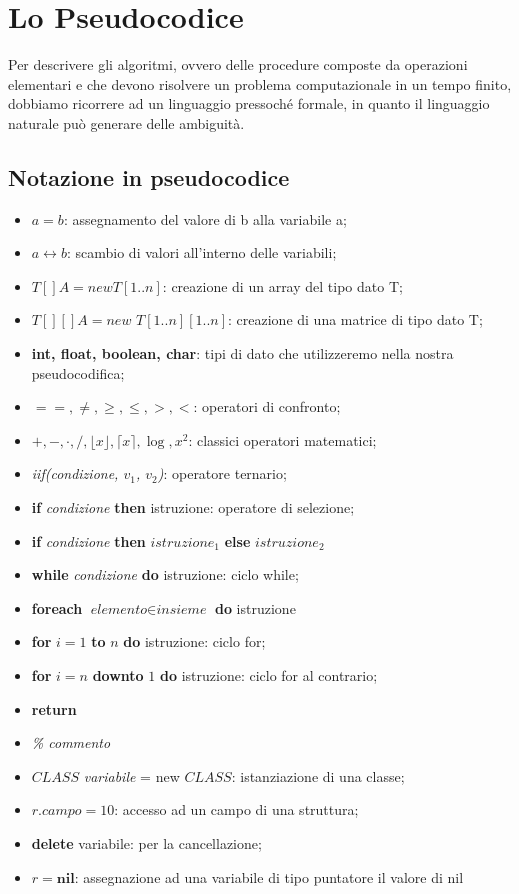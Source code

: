 \documentclass[../cheatSheetAlgoritmi.tex]{subfiles}
\begin{document}
\section{Lo Pseudocodice}
Per descrivere gli algoritmi, ovvero delle procedure composte da operazioni elementari e che devono risolvere un problema computazionale in un tempo finito, dobbiamo ricorrere ad un linguaggio pressoché formale, in quanto il linguaggio naturale può generare delle ambiguità.
\subsection{Notazione in pseudocodice}
\begin{itemize}
  	\item $a=b$: assegnamento del valore di b alla variabile a;
  	\item $a \leftrightarrow b$: scambio di valori all'interno delle variabili;
  	\item $T[] A = new T[1..n]$: creazione di un array del tipo dato T;
  	\item $T[][] A = new$ $T[1..n][1..n]$: creazione di una matrice di tipo dato T;
  	\item \textbf{int, float, boolean, char}: tipi di dato che utilizzeremo nella nostra pseudocodifica;
  	\item $==, \neq, \geq, \leq, >, <$: operatori di confronto;
  	\item $+, -, \cdot, /, \lfloor x \rfloor, \lceil x \rceil, \log, x^2$: classici operatori matematici;
  	\item \textit{iif(condizione, $v_1$, $v_2$)}: operatore ternario;
  	\item \textbf{if} \textit{condizione} \textbf{then} istruzione: operatore di selezione;
  	\item \textbf{if} \textit{condizione} \textbf{then} $istruzione_1$ \textbf{else} $istruzione_2$
  	\item \textbf{while} \textit{condizione} \textbf{do} istruzione: ciclo while;
  	\item \textbf{foreach} $\textit{elemento} \in \textit{insieme}$ \textbf{do} istruzione
  	\item \textbf{for} $i = 1$ \textbf{to} $n$ \textbf{do} istruzione: ciclo for;
  	\item \textbf{for} $i = n$ \textbf{downto} $1$ \textbf{do} istruzione: ciclo for al contrario;
  	\item \textbf{return}
  	\item \textit{\% commento}
  	\item $CLASS$ \textit{variabile} = new $CLASS$: istanziazione di una classe;
  	\item $\textit{r.campo}= 10$: accesso ad un campo di una struttura;
  	\item \textbf{delete} variabile: per la cancellazione;
	\item $r = \textbf{nil}$: assegnazione ad una variabile di tipo puntatore il valore di nil
\end{itemize}
\end{document}
